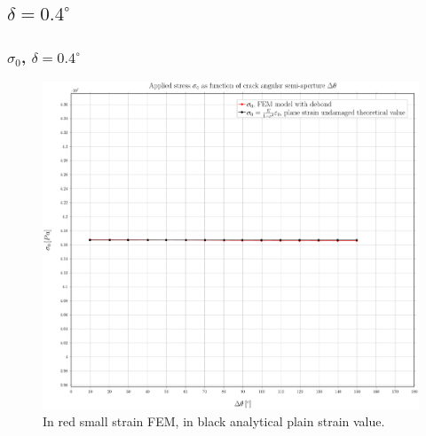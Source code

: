 \documentclass[first,firstsupp,lastsupp,handout,last,hyperref,table]{ETHclass}
\begin{document}


\subsection{$\delta=0.4^{\circ}$}

\begin{frame}
\frametitle{\small $\sigma_{0}$, $\delta=0.4^{\circ}$}
\vspace{-0.5cm}
\centering
\captionsetup[figure]{font=scriptsize,labelfont=scriptsize}
\begin{figure}[!h]
\centering
\includegraphics[height=0.7\textheight]{2017-07-10_AbqRunSummary_SmallStrainD04_sigma-inf_Summary.pdf}
  \caption{\scriptsize In red small strain FEM, in black analytical plain strain value.}
  \label{fig:res1}
\end{figure}
\end{frame}
\end{document}

